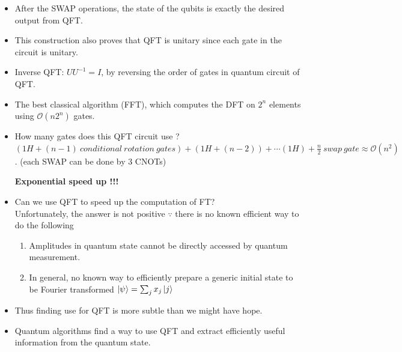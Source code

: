 \documentclass[]{book}
\theoremstyle{nonumberplain}
\begin{document}
\begin{itemize}
        \item After the SWAP operations, the state of the qubits is exactly the desired output from QFT.
	\item This construction also proves that QFT is unitary since each gate in the circuit is unitary.
        \item Inverse QFT: $UU^{-1} = I$, by reversing the order of gates in quantum circuit of QFT.
	\item The best classical algorithm (FFT), which computes the DFT on $2^{n}$ elements using $\mathcal{O}(n2^{n})$ gates.
	\item How many gates does this QFT circuit use ? \\ $(1H+(n-1)\ conditional\ rotation\ gates) + (1H+(n-2)) + \cdots (1H) + \frac{n}{2}\ swap\ gate\approx \mathcal{O}(n^{2})$. (each SWAP can be done by 3 CNOTs)
	\begin{center}
	\textbf{Exponential speed up !!!}
	\end{center}
	\item Can we use QFT to speed up the computation of FT?\\
		Unfortunately, the answer is not positive $\because$ there is no known efficient way to do the following 
\begin{enumerate}
	\item Amplitudes in quantum state cannot be directly accessed by quantum measurement.
	\item In general, no known way to efficiently prepare a generic initial state to be Fourier transformed $\ket{\psi}= \sum^{}_{j} x_{j}\ket{j}$
\end{enumerate}
	\item Thus finding use for QFT is more subtle than we might have hope.
	\item Quantum algorithms find a way to use QFT and extract efficiently useful information from the quantum state.
\end{itemize}
\end{document}
